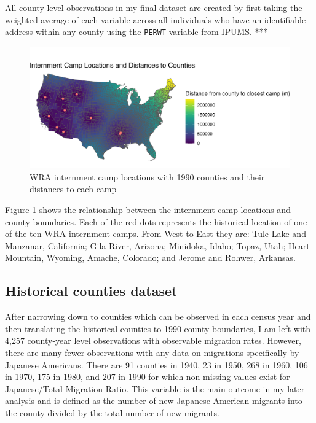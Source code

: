 \documentclass[12pt]{article}
\begin{document}
All county-level observations in my final dataset are created by first taking the weighted average of each variable across all individuals who have an identifiable address within any county 
using the \texttt{PERWT} variable from IPUMS. 
***

\begin{figure}[H]
    \centering
    \includegraphics[width=1.0\textwidth]{figures/countymap.png}
    \caption{WRA internment camp locations with 1990 counties and their distances to each camp}
    \label{fig:countymap}
\end{figure}

Figure \ref{fig:countymap} shows the relationship between the internment camp locations and county boundaries. 
Each of the red dots represents the historical location of one of the ten WRA internment camps. 
From West to East they are:
Tule Lake and Manzanar, California;
Gila River, Arizona;
Minidoka, Idaho;
Topaz, Utah;
Heart Mountain, Wyoming,
Amache, Colorado;
and
Jerome and Rohwer, Arkansas.

\subsection{Historical counties
dataset}\label{historical-counties-dataset}


After narrowing down to counties which can be observed in each census
year and then translating the historical counties to 1990 county
boundaries, I am left with 4,257 county-year level observations with observable migration rates.
However, there are many fewer observations with any data on migrations specifically by Japanese Americans.
There are 91 counties in 1940, 23 in 1950, 268 in 1960, 106 in 1970, 175 in 1980, and 207 in 1990 for which non-missing values exist for Japanese/Total Migration Ratio.
This variable is the main outcome in my later analysis and is defined as the number of new Japanese American migrants into the county divided by the total number of new migrants.
\end{document}
